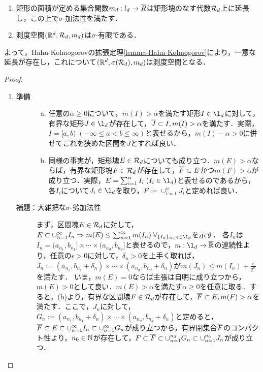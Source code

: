 \documentclass[uplatex, dvipdfmx]{jsreport}
\begin{document}
\begin{lemma}[Lebesgue測度の存在と一意性]\mbox{}\label{lemma-Lebesgue-measure}
    \begin{enumerate}
        \item 矩形の面積が定める集合関数$m_d:l_d\to\overline{R}$は矩形塊のなす代数$\mathcal{R}_d$上に延長し，この上で$\sigma$-加法性を満たす．
        \item 測度空間$(\mathbb{R}^d,\mathcal{R}_d,m_d)$は$\sigma$-有限である．
    \end{enumerate}
    よって，Hahn-Kolmogorovの拡張定理\ref{lemma-Hahn-Kolmogorov}により，一意な延長が存在し，これについて$(\mathbb{R}^d,\sigma(\mathcal{R}_d),m_d)$は測度空間となる．
\end{lemma}
\begin{proof}\mbox{}
    \begin{enumerate}
        \item \begin{description}
            \item[準備] \begin{enumerate}[(a)]
                \item 任意の$\alpha\ge 0$について，$m(I)>\alpha$を満たす矩形$I\in\l_d$に対して，有界な矩形$J\in\l_d$が存在して，$\overline{J}\subset I,m(I)>\alpha$を満たす．実際，$I=[a,b)\;(-\infty\le a<b\le\infty)$と表せるから，$m(I)-\alpha>0$に併せてこれを狭めた区間を$J$とすれば良い．
                \item 同様の事実が，矩形塊$E\in\mathcal{R}_d$についても成り立つ．$m(E)>\alpha$ならば，有界な矩形塊$F\in\mathcal{R}_d$が存在して，$\overline{F}\subset E$かつ$m(F)>\alpha$が成り立つ．実際，$E=\sum^n_{i=1}I_i\;(I_i\in\l_d)$と表せるのであるから，各$I_i$について$J_i\in\l_d$を取り，$F:=\cup_{i=1}^nJ_i$と定めれば良い．
            \end{enumerate}
            \item[補題：大雑把な$\sigma$-劣加法性] まず，区間塊$E\in\mathcal{R}_d$に対して，$E\subset\cupn I_n\Rightarrow m(E)\le\sumn m(I_n)\;\forall_{\{I_n\}_{n\in\N}\subset\l_d}$を示す．
            各$I_n$は$I_n=(a_{n_1},b_{n_1}]\times\cdots\times(a_{n_d},b_{n_d}]$と表せるので，$m:\l_d\to\o{\R}$の連続性より，任意の$\epsilon>0$に対して，$\delta_n>0$を上手く取れば，$J_n:=(a_{n_1},b_{n_1}+\delta_n)\times\cdots\times(a_{n_d},b_{n_d}+\delta_n)$が$m(J_n)\le m(I_n)+\frac{\epsilon}{2^n}$を満たす．
            いま，$m(E)=0$ならば主張は自明に成り立つから，$m(E)>0$として良い．$m(E)>\alpha$を満たす$\alpha\ge 0$を任意に取る．すると，(b)より，有界な区間塊$F\in\mathcal{R}_d$が存在して，$\overline{F}\subset E,m(F)>\alpha$を満たす．ここで，$J_n$に対して，$G_n:=(a_{n_1},b_{n_1}+\delta_n)\times\cdots\times(a_{n_d},b_{n_d}+\delta_n)$と定めると，$\overline{F}\subset E\subset\cup_{n=1}^\infty I_n\subset\cup_{n=1}^\infty G_n$が成り立つから，有界閉集合$\overline{F}$のコンパクト性より，$n_0\in\mathbb{N}$が存在して，$F\subset\overline{F}\subset\cup_{n=1}^{n_0}G_n\subset\cup_{n=1}^{n_0}J_n$が成り立つ．

\end{description}
\end{enumerate}
\end{proof}
\end{document}
